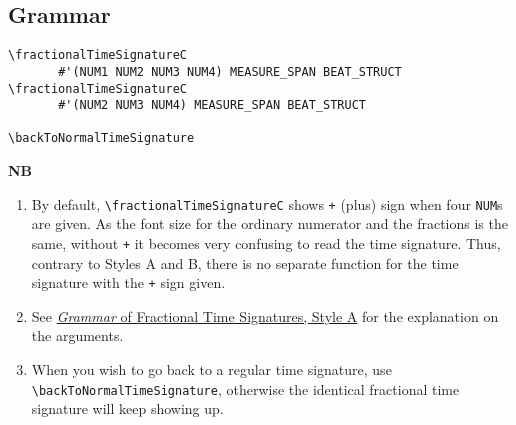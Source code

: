 \subsection{Grammar}
\begin{verbatim}
\fractionalTimeSignatureC 
       #'(NUM1 NUM2 NUM3 NUM4) MEASURE_SPAN BEAT_STRUCT
\fractionalTimeSignatureC 
       #'(NUM2 NUM3 NUM4) MEASURE_SPAN BEAT_STRUCT
       
\backToNormalTimeSignature

\end{verbatim}
\textbf{NB} 
\begin{enumerate}
\item By default, \verb|\fractionalTimeSignatureC| shows \verb|+| (plus) sign when four \verb|NUM|s are given. As the font size for the ordinary numerator and the fractions is the same, without \verb|+| it becomes very confusing to read the time signature. Thus, contrary to Styles A and B, there is no separate function for the time signature with the \verb|+| sign given.
\item See \hyperref[sec:time_signatures_styleA_convention]{\textit{Grammar} of Fractional Time Signatures, Style A} for the explanation on the arguments.
\item When you wish to go back to a regular time signature, use \verb|\backToNormalTimeSignature|, otherwise the identical fractional time signature will keep showing up.
\end{enumerate}
